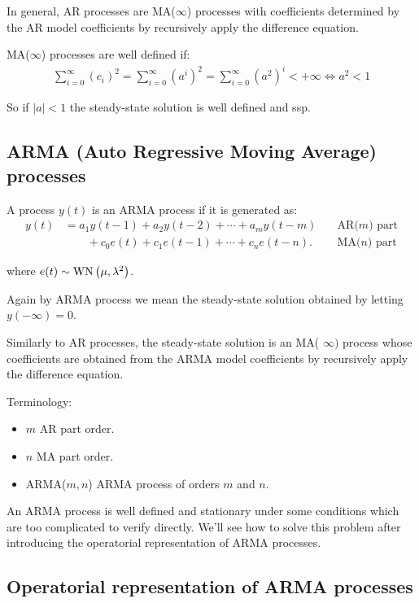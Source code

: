 In general, AR processes are MA($\infty$) processes with coefficients determined by the AR model coefficients by recursively apply the difference equation.

MA($\infty$) processes are well defined if:
\begin{align*}
	\sum_{i=0}^{\infty} \left(c_{i}\right)^2=\sum_{i=0}^{\infty} \left(a^{i}\right)^2=\sum_{i=0}^{\infty} \left(a^{2}\right)^i< +\infty \iff a^2< 1
\end{align*}

So if $|a|<1$ the steady-state solution is well defined and \gls{ssp}.

\subsection{ARMA (Auto Regressive Moving Average) processes}

A process $y(t)$ is an ARMA process if it is generated as:
\begin{align*}
	y(t)&=a_{1} y(t-1)+a_{2} y(t-2)+\cdots+a_{m} y(t-m)\quad & \text{AR($m$) part}\\
	&\qquad+c_{0} e(t)+c_{1} e(t-1)+\cdots+c_{n} e(t-n) . \quad & \text{MA($n$) part}
\end{align*}

where $e(t) \sim \operatorname{WN}\left(\mu, \lambda^{2}\right)$.

Again by ARMA process we mean the steady-state solution obtained by letting $y(-\infty)=0$.
 
Similarly to AR processes, the steady-state solution is an MA( $\infty)$ process whose coefficients are obtained from the ARMA model coefficients by recursively apply the difference equation.
 
Terminology:
\begin{itemize}
	\item $m$ AR part order.
	\item $n$ MA part order.
	\item ARMA($m,n$) ARMA process of orders $m$ and $n$.
\end{itemize}

An ARMA process is well defined and stationary under some conditions which are too complicated to verify directly.
We'll see how to solve this problem after introducing the operatorial 
representation of ARMA processes.

\subsection{Operatorial representation of ARMA processes}

